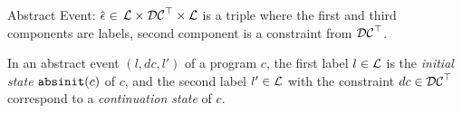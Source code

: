  \begin{defn}
 \label{def:abs_event}
 Abstract Event: 
 $\hat{\mathtt{\epsilon}{}} \in $
 $\mathcal{L} \times \mathcal{DC}^{\top} \times \mathcal{L}$
 is a 
 triple where the first and third components are labels,
 second component is a constraint from $\mathcal{DC}^{\top}$.
 \end{defn}
 In an abstract event $(l, dc, l')$ of a program $c$, 
 the first label $l \in \mathcal{L}$ is the \emph{initial state} $\mathtt{abs}{\mathtt{init}}(c)$ of $c$, and 
 the second label $l' \in \mathcal{L}$ with the constraint $dc \in \mathcal{DC}^{\top}$ correspond to a \emph{continuation state} of $c$.

